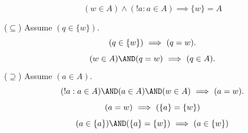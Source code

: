 \begin{theorem}
\[
(w\in A) \land (!a:a\in A) \implies \{w\}=A
\]
\end{theorem}
\Proof
\noindent($\subseteq$) Assume $(q\in \{w\})$.
\[
(q\in \{w\})\ \Longrightarrow\ (q=w).
\]
\[
(w\in A)\AND(q=w)\IMPLIES(q\in A).
\]
\noindent($\supseteq$) Assume $(a\in A)$.
\[
(!a:a\in A)\AND(a\in A)\AND(w\in A)\IMPLIES(a=w).
\]
\[
(a=w)\ \Longrightarrow\ (\{a\}=\{w\})
\]
\[
(a\in\{a\})\AND(\{a\}=\{w\})\IMPLIES(a\in\{w\})
\]
\Done

